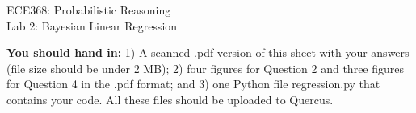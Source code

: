 \documentclass[twoside]{article}
\begin{document}
\begin{center}
\begin{spacing}{1.75}
{\Large { ECE368: Probabilistic Reasoning} \\
	{Lab 2: Bayesian Linear Regression}}
\end{spacing}
\vspace{-1em}
\end{center}
\begin{center}
   \end{center}
{\bf You should hand in:} 1) A scanned \textsf{.pdf} version of this sheet with your answers (file size
should be under $2$ MB); 2) four figures for Question 2 and three figures for Question 4
in the \textsf{.pdf} format; and 3) one Python file \textsf{regression.py} that
contains your code. All these files should be uploaded to Quercus.
\end{document}
